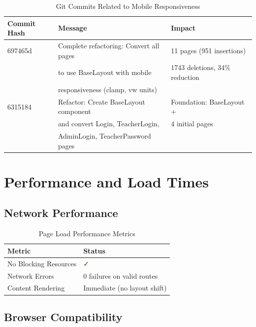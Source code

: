 \documentclass[11pt, a4paper]{report}
\begin{document}
\begin{table}[H]
    \centering
    \caption{Git Commits Related to Mobile Responsiveness}
    \begin{tabular}{|l|l|l|}
        \hline
        \textbf{Commit Hash} & \textbf{Message} & \textbf{Impact} \\
        \hline
        697465d & Complete refactoring: Convert all pages & 11 pages (951 insertions) \\
        & to use BaseLayout with mobile & 1743 deletions, 34\% reduction \\
        & responsiveness (clamp, vw units) & \\
        \hline
        6315184 & Refactor: Create BaseLayout component & Foundation: BaseLayout + \\
        & and convert Login, TeacherLogin, & 4 initial pages \\
        & AdminLogin, TeacherPassword pages & \\
        \hline
    \end{tabular}
\end{table}

\chapter{Performance and Load Times}

\section{Network Performance}

\begin{table}[H]
    \centering
    \caption{Page Load Performance Metrics}
    \begin{tabular}{|l|l|}
        \hline
        \textbf{Metric} & \textbf{Status} \\
        \hline
        No Blocking Resources & \textcolor{darkgreen}{✓} \\
        Network Errors & 0 failures on valid routes \\
        Content Rendering & Immediate (no layout shift) \\
        \hline
    \end{tabular}
\end{table}

\section{Browser Compatibility}
\end{document}
